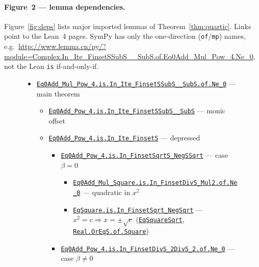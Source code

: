 \documentclass[11pt,a4paper]{article}
\begin{document}
\paragraph{Figure~2 --- lemma dependencies.}
Figure~\ref{fig:deps} lists major imported lemmas of Theorem~\ref{thm:quartic}.
Links point to the Lean~4 pages.
SymPy has only the one-direction (\texttt{of}/\texttt{mp}) names, e.g.\ \url{http://www.lemma.cn/py/?module=Complex.In_Ite_FinsetSSubS__SubS.of.Eq0Add_Mul_Pow_4.Ne_0}, not the Lean \texttt{is} if-and-only-if.

\begin{figure}[ht]
\small
\begin{itemize}[leftmargin=1.2em,itemsep=0.15em]
  \item \href{http://www.lemma.cn/lean/?module=Complex.Eq0Add_Mul_Pow_4.is.In_Ite_FinsetSSubS__SubS.of.Ne_0}{\texttt{Eq0Add\_Mul\_Pow\_4.is.In\_Ite\_FinsetSSubS\_\_SubS.of.Ne\_0}} --- main theorem
  \begin{itemize}[leftmargin=1.1em,itemsep=0.1em]
    \item \href{http://www.lemma.cn/lean/?module=Complex.Eq0Add_Pow_4.is.In_Ite_FinsetSSubS__SubS}{\texttt{Eq0Add\_Pow\_4.is.In\_Ite\_FinsetSSubS\_\_SubS}} --- monic offset
    \item \href{http://www.lemma.cn/lean/?module=Complex.Eq0Add_Pow_4.is.In_Ite_FinsetS}{\texttt{Eq0Add\_Pow\_4.is.In\_Ite\_FinsetS}} --- depressed
    \begin{itemize}[leftmargin=1.1em,itemsep=0.05em]
      \item \href{http://www.lemma.cn/lean/?module=Complex.Eq0Add_Pow_4.is.In_FinsetSqrtS_NegSSqrt}{\texttt{Eq0Add\_Pow\_4.is.In\_FinsetSqrtS\_NegSSqrt}} --- case \(\beta=0\)
      \begin{itemize}[leftmargin=1.1em,itemsep=0.05em]
        \item \href{http://www.lemma.cn/lean/?module=Complex.Eq0Add_Mul_Square.is.In_FinsetDivS_Mul2.of.Ne_0}{\texttt{Eq0Add\_Mul\_Square.is.In\_FinsetDivS\_Mul2.of.Ne\_0}} --- quadratic in \(x^2\)
        \item \href{http://www.lemma.cn/lean/?module=Complex.EqSquare.is.In_FinsetSqrt_NegSqrt}{\texttt{EqSquare.is.In\_FinsetSqrt\_NegSqrt}} --- \(x^2=c\Rightarrow x=\pm\sqrt{c}\)
        (\href{http://www.lemma.cn/lean/?module=Complex.EqSquareSqrt}{\texttt{EqSquareSqrt}},
        \href{http://www.lemma.cn/lean/?module=Real.OrEqS.of.Square}{\texttt{Real.OrEqS.of.Square}})
      \end{itemize}
      \item \href{http://www.lemma.cn/lean/?module=Complex.Eq0Add_Pow_4.is.In_FinsetDivS_2DivS_2.of.Ne_0}{\texttt{Eq0Add\_Pow\_4.is.In\_FinsetDivS\_2DivS\_2.of.Ne\_0}} --- case \(\beta\neq 0\)

\end{itemize}
\end{itemize}
\end{itemize}
\end{figure}
\end{document}
